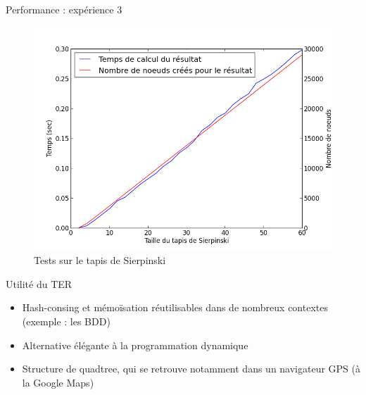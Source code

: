 \documentclass{beamer}
\begin{document}
\begin{frame}{Performance : expérience 3}
  \begin{figure}
    \centering
    \includegraphics[scale=0.4]{perf_carpet_time_created.png}
    \caption{Tests sur le tapis de Sierpinski}
  \end{figure}
\end{frame}

\begin{frame}{Utilité du TER}
  \begin{itemize}
  \item Hash-consing et mémoïsation réutilisables dans de nombreux contextes
    (exemple : les BDD)
  \item Alternative élégante à la programmation dynamique
  \item Structure de quadtree, qui se retrouve notamment dans un navigateur GPS
    (à la Google Maps)
  \end{itemize}
\end{frame}
 
\end{document}
